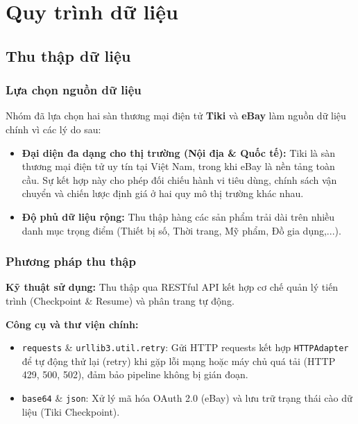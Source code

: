 \section{Quy trình dữ liệu}

\subsection{Thu thập dữ liệu}

\subsubsection{Lựa chọn nguồn dữ liệu}

Nhóm đã lựa chọn hai sàn thương mại điện tử \textbf{Tiki} và \textbf{eBay} làm nguồn dữ liệu chính vì các lý do sau:
\begin{itemize}
    \item \textbf{Đại diện đa dạng cho thị trường (Nội địa \& Quốc tế):} Tiki là sàn thương mại điện tử uy tín tại Việt Nam, trong khi eBay là nền tảng toàn cầu. Sự kết hợp này cho phép đối chiếu hành vi tiêu dùng, chính sách vận chuyển và chiến lược định giá ở hai quy mô thị trường khác nhau.
    \item \textbf{Độ phủ dữ liệu rộng:} Thu thập hàng các sản phẩm trải dài trên nhiều danh mục trọng điểm (Thiết bị số, Thời trang, Mỹ phẩm, Đồ gia dụng,...).
\end{itemize}

\subsubsection{Phương pháp thu thập}

\textbf{Kỹ thuật sử dụng:} Thu thập qua RESTful API kết hợp cơ chế quản lý tiến trình (Checkpoint \& Resume) và phân trang tự động.

\textbf{Công cụ và thư viện chính:}
\begin{itemize}
    \item \texttt{requests} \& \texttt{urllib3.util.retry}: Gửi HTTP requests kết hợp \texttt{HTTPAdapter} để tự động thử lại (retry) khi gặp lỗi mạng hoặc máy chủ quá tải (HTTP 429, 500, 502), đảm bảo pipeline không bị gián đoạn.
    \item \texttt{base64} \& \texttt{json}: Xử lý mã hóa OAuth 2.0 (eBay) và lưu trữ trạng thái cào dữ liệu (Tiki Checkpoint).
\end{itemize}

